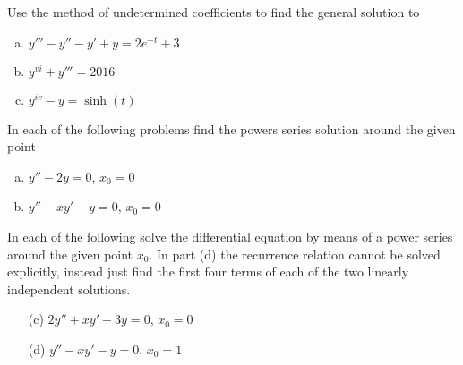 \documentclass[12pt,letterpaper]{hmcpset}
\begin{document}

\begin{problem}[G1]
    Use the method of undetermined coefficients to find the general solution to
    \begin{enumerate}[(a)]
        \item $y'''-y''-y'+y = 2e^{-t}+3$
        \item $y^{vi} + y''' = 2016$
        \item $y^{iv}-y=\sinh(t)$
    \end{enumerate}
\end{problem}

\begin{solution}
    \vfill
\end{solution}
\clearpage

\begin{problem}[G2]
    In each of the following problems find the powers series solution around the given point
    \begin{enumerate}[(a)]
        \item $y''-2y=0$, $x_0=0$
        \item $y''-xy'-y=0$, $x_0=0$
    \end{enumerate}
\end{problem}

\begin{solution}
    \vfill
\end{solution}
\clearpage

\begin{problem}[G3]
    In each of the following solve the differential equation by means of a power series around
    the given point $x_0$. In part (d) the recurrence relation cannot be solved explicitly, instead
    just find the first four terms of each of the two linearly independent solutions.
    \begin{enumerate}[(a)]
        \item[(c)] $2y'' + xy' + 3y = 0$, $x_0 = 0$
        \item[(d)] $y'' - xy' - y = 0$, $x_0=1$
    \end{enumerate}
\end{problem}

\begin{solution}
    \vfill
\end{solution}
\clearpage
\end{document}
